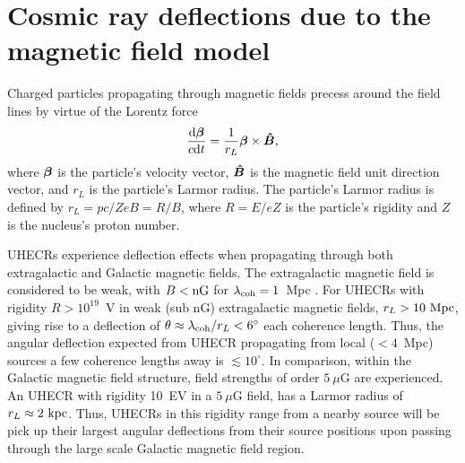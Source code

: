 \documentclass[usenatbib]{mnras}
\newcommand{\Vasu}[1]{{\color{purple}#1}}
\newcommand{\bfm}[1]{\mbox{\boldmath$ #1 $}}
\begin{document}



\section{Cosmic ray deflections due to the magnetic field model}
\label{Deflections}

Charged particles propagating through magnetic fields precess around the field lines by virtue of the Lorentz force 
\begin{eqnarray}
\frac{{\rm d}\bfm{\beta}}{c{\rm d}t} = \frac{1}{r_{L}}\bfm{\beta}\times \bfm{\hat{B}}, 
\end{eqnarray}
where $\bfm{\beta}$ is the particle's velocity vector, $\bfm{\hat{B}}$ is the magnetic field unit direction vector, and $r_{L}$ is the particle's Larmor radius. The particle's Larmor radius is defined by $r_{L}=pc/ZeB=R/B$, where $R=E/eZ $ is the particle's rigidity and $Z$ is the nucleus's proton number. 

UHECRs experience deflection effects when propagating through both extragalactic and Galactic magnetic fields. The extragalactic magnetic field is considered to be weak, with $B < \rm {nG}$ for $\lambda_{\rm coh}=1$~Mpc \citep{Blasi_1999, Kronberg_2007}. For UHECRs with rigidity $R > 10^{19}$~V in weak (sub nG) extragalactic magnetic fields, $r_{L}>{\rm 10~Mpc}$, giving rise to a deflection of $\theta\approx \lambda_{\rm coh}/r_{L}<6^{\circ}$ each coherence length. Thus, the angular deflection expected from UHECR propagating from local ($<4$~Mpc) sources a few coherence lengths away is $\lesssim 10^{\circ}$. In comparison, within the Galactic magnetic field structure, field strengths of order $5~\mu$G are experienced. An UHECR with rigidity 10~EV in a $5~\mu$G field, has a Larmor radius of $r_L \approx 2 ~ \rm kpc$. Thus, UHECRs in this rigidity range from a nearby source will be pick up their largest angular deflections from their source positions upon passing through the large scale Galactic magnetic field region.
\end{document}
